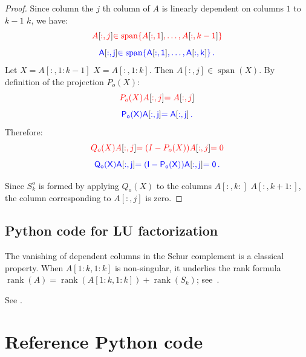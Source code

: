\documentclass[10pt,twoside]{siamart1116}
\DeclareMathOperator{\rk}{rank}
\DeclareMathOperator{\spn}{span}
\numberwithin{theorem}{section}
\providecommand{\DIFadd}[1]{{\protect\color{blue} \sf #1}} %
\providecommand{\DIFdel}[1]{{\protect\color{red} \scriptsize #1}} %
\providecommand{\DIFaddbegin}{} %
\providecommand{\DIFaddend}{} %
\providecommand{\DIFdelbegin}{} %
\providecommand{\DIFdelend}{} %
\begin{document}
\begin{proof}
  Since \DIFdelbegin \DIFdel{column }\DIFdelend \DIFaddbegin \DIFadd{the }\DIFaddend $j$\DIFaddbegin \DIFadd{th column }\DIFaddend of $A$ is linearly dependent on columns $1$ to \DIFdelbegin \DIFdel{$k-1$}\DIFdelend \DIFaddbegin \DIFadd{$k$}\DIFaddend , we have:
  \DIFdelbegin \[ \DIFdel{A}[\DIFdel{:,j}] \DIFdel{\in \spn\{ A}[\DIFdel{:,1}]\DIFdel{, \ldots, A}[\DIFdel{:,k-1}] \DIFdel{\} }\]%
\DIFdelend \DIFaddbegin \[ \DIFadd{A}[\DIFadd{:,j}] \DIFadd{\in \spn\{ A}[\DIFadd{:,1}]\DIFadd{, \ldots, A}[\DIFadd{:,k}] \DIFadd{\} \,. }\]\DIFaddend  %
  Let \DIFdelbegin \DIFdel{$X = A[:,1:k-1]$}\DIFdelend \DIFaddbegin \DIFadd{$X = A[:,1:k]$}\DIFaddend . Then $A[:,j] \in \spn(X)$. By definition of the projection $P_o(X)$:
  \DIFdelbegin \[ \DIFdel{P_o(X) A}[\DIFdel{:,j}] \DIFdel{= A}[\DIFdel{:,j}] \DIFdel{}\]%
\DIFdelend \DIFaddbegin \[ \DIFadd{P_o(X) A}[\DIFadd{:,j}] \DIFadd{= A}[\DIFadd{:,j}] \DIFadd{\,. }\]\DIFaddend 
  Therefore:
  \DIFdelbegin \[ \DIFdel{Q_o(X) A}[\DIFdel{:,j}] \DIFdel{= (I - P_o(X)) A}[\DIFdel{:,j}] \DIFdel{= 0 }\]%
\DIFdelend \DIFaddbegin \[ \DIFadd{Q_o(X) A}[\DIFadd{:,j}] \DIFadd{= (I - P_o(X)) A}[\DIFadd{:,j}] \DIFadd{= 0 \,. }\]\DIFaddend 

  Since $S^o_k$ is formed by applying $Q_o(X)$ to the columns \DIFdelbegin \DIFdel{$A[:,k:]$}\DIFdelend \DIFaddbegin \DIFadd{$A[:,k+1:]$}\DIFaddend , the column corresponding to $A[:,j]$ is zero.
\end{proof}

\DIFdelbegin \subsection{\DIFdel{Python code for LU factorization}}%
\addtocounter{subsection}{-1}%
\DIFdelend \DIFaddbegin \DIFadd{The vanishing of dependent columns in the Schur complement is a classical property. When $A[1:k,1:k]$ is non-singular, it underlies the rank formula $\rk(A) = \rk(A[1:k,1:k]) + \rk(S_k)$; see~\cite{Marsaglia_1974,Carlson_1986,Cottle_1974}.
}\DIFaddend 

\DIFdelbegin \DIFdel{See }%
\DIFdel{. }\DIFdelend \DIFaddbegin \section{\DIFadd{Reference Python code}}
\DIFaddend 
\end{document}
